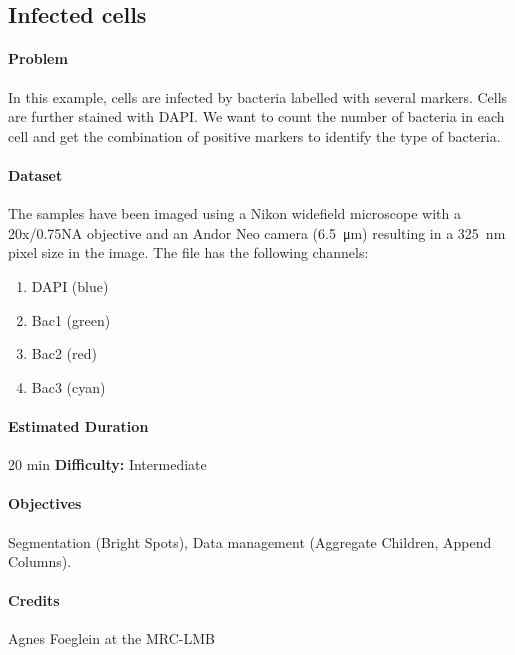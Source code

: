 \subsection{Infected cells}

\paragraph{Problem}

In this example, cells are infected by bacteria labelled with several markers. Cells are further stained with DAPI. We want to count the number of bacteria in each cell and get the combination of positive markers to identify the type of bacteria.


\paragraph{Dataset} 
The samples have been imaged using a Nikon widefield microscope with a 20x/0.75NA objective and an Andor Neo camera (\SI{6.5}{\micro\meter}) resulting in a \SI{325}{\nano\meter} pixel size in the image. The file  has the following channels:
\begin{enumerate}\itemsep0em
    \item DAPI (blue)
    \item Bac1 (green)
    \item Bac2 (red)
    \item Bac3 (cyan)
\end{enumerate}

\paragraph{Estimated Duration} 20 min \quad \textbf{Difficulty:} Intermediate

\paragraph{Objectives} Segmentation (Bright Spots), Data management (Aggregate Children, Append Columns).

\paragraph{Credits} Agnes Foeglein at the MRC-LMB

